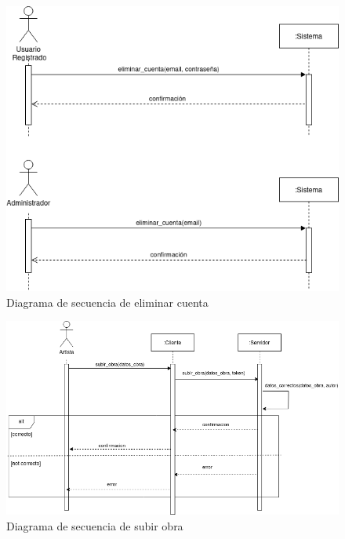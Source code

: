 \begin{figure}[h]
    \centering
    \includegraphics[width=\textwidth]{diagramas/secuencia_eliminar_cuenta.png}
    \caption{Diagrama de secuencia de eliminar cuenta}
    \label{fig:eliminar_cuenta}
\end{figure}

\begin{figure}[h]
    \centering
    \includegraphics[width=\textwidth]{diagramas/secuencia_subir_obra.png}
    \caption{Diagrama de secuencia de subir obra}
    \label{fig:subir_obra}
\end{figure}

